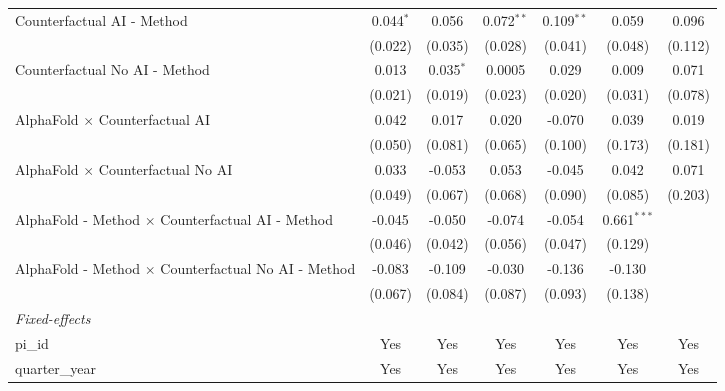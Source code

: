 \begin{tabular}{lcccccc}
   Counterfactual AI - Method                                 & 0.044$^{*}$   & 0.056        & 0.072$^{**}$ & 0.109$^{**}$ & 0.059         & 0.096\\   
                                                              & (0.022)       & (0.035)      & (0.028)      & (0.041)      & (0.048)       & (0.112)\\   
   Counterfactual No AI - Method                              & 0.013         & 0.035$^{*}$  & 0.0005       & 0.029        & 0.009         & 0.071\\   
                                                              & (0.021)       & (0.019)      & (0.023)      & (0.020)      & (0.031)       & (0.078)\\   
   AlphaFold $\times$ Counterfactual AI                       & 0.042         & 0.017        & 0.020        & -0.070       & 0.039         & 0.019\\   
                                                              & (0.050)       & (0.081)      & (0.065)      & (0.100)      & (0.173)       & (0.181)\\   
   AlphaFold $\times$ Counterfactual No AI                    & 0.033         & -0.053       & 0.053        & -0.045       & 0.042         & 0.071\\   
                                                              & (0.049)       & (0.067)      & (0.068)      & (0.090)      & (0.085)       & (0.203)\\   
   AlphaFold - Method $\times$ Counterfactual AI - Method     & -0.045        & -0.050       & -0.074       & -0.054       & 0.661$^{***}$ &   \\   
                                                              & (0.046)       & (0.042)      & (0.056)      & (0.047)      & (0.129)       &   \\   
   AlphaFold - Method $\times$ Counterfactual No AI - Method  & -0.083        & -0.109       & -0.030       & -0.136       & -0.130        &   \\   
                                                              & (0.067)       & (0.084)      & (0.087)      & (0.093)      & (0.138)       &   \\   
   \midrule
   \emph{Fixed-effects}\\
   pi\_id                                                     & Yes           & Yes          & Yes          & Yes          & Yes           & Yes\\  
   quarter\_year                                              & Yes           & Yes          & Yes          & Yes          & Yes           & Yes\\  

\end{tabular}
